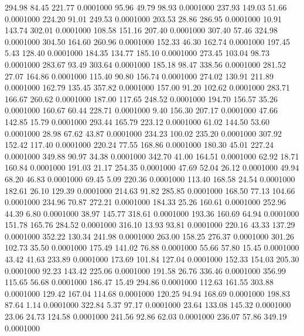  294.98   84.45  221.77   0.0001000
  95.96   49.79   98.93   0.0001000
 237.93  149.03   51.66   0.0001000
 224.20   91.01  249.53   0.0001000
 203.53   28.86  286.95   0.0001000
  10.91  143.74  302.01   0.0001000
 108.58  151.16  207.40   0.0001000
 307.40   57.46  324.98   0.0001000
 304.50  164.60  260.96   0.0001000
 152.33   46.30  162.74   0.0001000
 197.45    5.43  128.40   0.0001000
 184.35  134.77  185.10   0.0001000
 273.45  103.04   98.73   0.0001000
 283.67   93.49  303.64   0.0001000
 185.18   98.47  338.56   0.0001000
 281.52   27.07  164.86   0.0001000
 115.40   90.80  156.74   0.0001000
 274.02  130.91  211.89   0.0001000
 162.79  135.45  357.82   0.0001000
 157.00   91.20  102.62   0.0001000
 283.71  166.67  260.62   0.0001000
 187.00  117.65  248.52   0.0001000
 194.70  156.57   35.26   0.0001000
 160.67   60.44  228.71   0.0001000
   9.40  156.30  207.17   0.0001000
  47.66  142.85   15.79   0.0001000
 293.44  165.79  223.12   0.0001000
  61.02  144.50   53.60   0.0001000
  28.98   67.62   43.87   0.0001000
 234.23  100.02  235.20   0.0001000
 307.92  152.42  117.40   0.0001000
 220.24   77.55  168.86   0.0001000
 180.30   45.01  227.24   0.0001000
 349.88   90.97   34.38   0.0001000
 342.70   41.00  164.51   0.0001000
  62.92   18.71  160.84   0.0001000
 191.03   21.17  254.35   0.0001000
  47.69   52.04   26.12   0.0001000
  49.94   68.20   46.83   0.0001000
  69.45    5.09  220.36   0.0001000
 113.40  168.58   24.54   0.0001000
 182.61   26.10  129.39   0.0001000
 214.63   91.82  285.85   0.0001000
 168.50   77.13  104.66   0.0001000
 234.96   70.87  272.21   0.0001000
 184.33   25.26  160.61   0.0001000
 252.96   44.39    6.80   0.0001000
  38.97  145.77  318.61   0.0001000
 193.36  160.69   64.94   0.0001000
 151.78  165.76  284.52   0.0001000
 316.10   13.93   93.81   0.0001000
 220.16   43.33  137.29   0.0001000
 352.22  130.34  241.98   0.0001000
 263.00  158.25  276.37   0.0001000
 301.26  102.73   35.50   0.0001000
 175.49  141.02   76.88   0.0001000
  55.66   57.80   15.45   0.0001000
  43.42   41.63  233.89   0.0001000
 173.69  101.84  127.04   0.0001000
 152.33  154.03  205.30   0.0001000
  92.23  143.42  225.06   0.0001000
 191.58   26.76  336.46   0.0001000
 356.99  115.65   56.68   0.0001000
 186.47   15.49  294.86   0.0001000
 112.63  161.55  303.88   0.0001000
 129.42  167.04  114.68   0.0001000
 120.25   94.94  168.69   0.0001000
 198.83   87.64    1.14   0.0001000
 322.84    5.37   97.17   0.0001000
  23.64  133.08  145.32   0.0001000
  23.06   24.73  124.58   0.0001000
 241.56   92.86   62.03   0.0001000
 236.07   57.86  349.19   0.0001000
